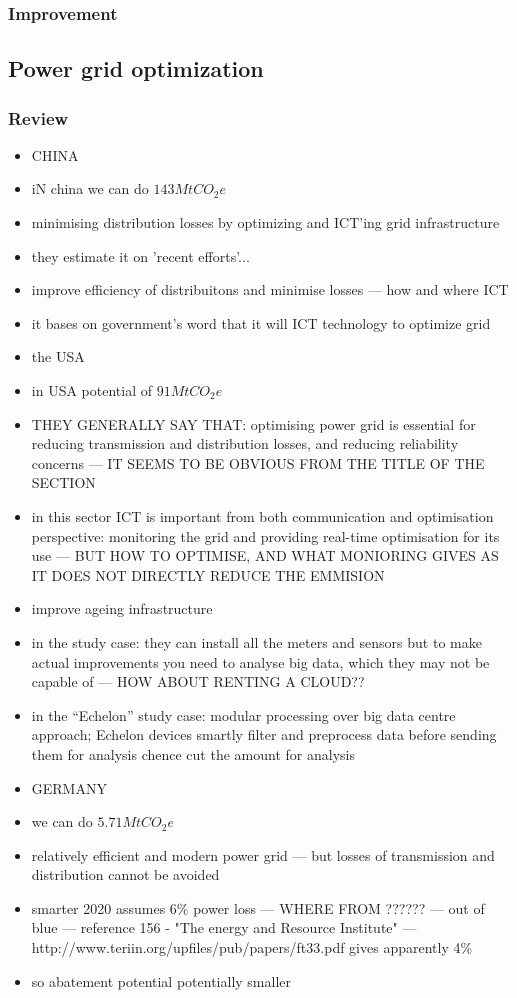 \documentclass[11pt, twocolumn]{article}
\begin{document}
\subsubsection{Improvement}

\subsection{Power grid optimization}
\subsubsection{Review}
\begin{itemize}
\item CHINA
\item iN china we can do $143 Mt CO_2e$
\item minimising distribution losses by optimizing and ICT'ing grid infrastructure
\item they estimate it on 'recent efforts'...
\item improve efficiency of distribuitons and minimise losses --- how and where ICT
\item it bases on government's word that it will ICT technology to optimize grid

\item the USA
\item in USA potential of $91 MtCO_2e$
\item THEY GENERALLY SAY THAT: optimising power grid is essential for reducing transmission and distribution losses, and reducing reliability concerns --- IT SEEMS TO BE OBVIOUS FROM THE TITLE OF THE SECTION
\item in this sector ICT is important from both communication and optimisation perspective: monitoring the grid and providing real-time optimisation for its use --- BUT HOW TO OPTIMISE, AND WHAT MONIORING GIVES AS IT DOES NOT DIRECTLY REDUCE THE EMMISION
\item improve ageing infrastructure
\item in the study case: they can install all the meters and sensors but to make actual improvements you need to analyse big data, which they may not be capable of --- HOW ABOUT RENTING A CLOUD??
\item in the ``Echelon'' study case: modular processing over big data centre approach; Echelon devices smartly filter and preprocess data before sending them for analysis chence cut the amount for analysis

\item GERMANY
\item we can do $5.71 Mt CO_2e$
\item relatively efficient and modern power grid --- but losses of transmission and distribution cannot be avoided
\item smarter 2020 assumes 6\% power loss --- WHERE FROM ?????? --- out of blue --- reference 156 - "The energy and Resource Institute" --- http://www.teriin.org/upfiles/pub/papers/ft33.pdf gives apparently 4\%
\item so abatement potential potentially smaller


\end{itemize}
\end{document}
